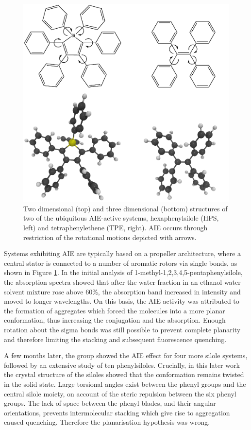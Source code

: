 \begin{figure}[H]
\centering
  \includegraphics[width=0.7\linewidth]{Intro/HPS_TPE.pdf}
  \caption[Examples of AIE-active chromophores]{Two dimensional (top) and three dimensional (bottom) structures of two of the ubiquitous AIE-active systems, hexaphenylsilole (HPS, left) and tetraphenylethene (TPE, right). AIE occurs through restriction of the rotational motions depicted with arrows.}
  \label{figure: HPS_TPE}
\end{figure}

Systems exhibiting AIE are typically based on a propeller architecture, where a central stator is connected to a number of aromatic rotors via single bonds, as shown in Figure \ref{figure: HPS_TPE}. In the initial analysis of 1-methyl-1,2,3,4,5-pentaphenylsilole, the absorption spectra showed that after the water fraction in an ethanol-water solvent mixture rose above 60\%, the absorption band increased in intensity and moved to longer wavelengths.\cite{Luo2001} On this basis, the AIE activity was attributed to the formation of aggregates which forced the molecules into a more planar conformation, thus increasing the conjugation and the absorption. Enough rotation about the sigma bonds was still possible to prevent complete planarity and therefore limiting the stacking and subsequent fluorescence quenching. 

A few months later, the group showed the AIE effect for four more silole systems, followed by an extensive study of ten phenylsiloles.\cite{Tang2001,Chen2003} Crucially, in this later work the crystal structure of the siloles showed that the conformation remains twisted in the solid state.\cite{Chen2003} Large torsional angles exist between the phenyl groups and the central silole moiety, on account of the steric repulsion between the six phenyl groups. The lack of space between the phenyl blades, and their angular orientations, prevents intermolecular stacking which give rise to aggregation caused quenching. Therefore the planarisation hypothesis was wrong. 

